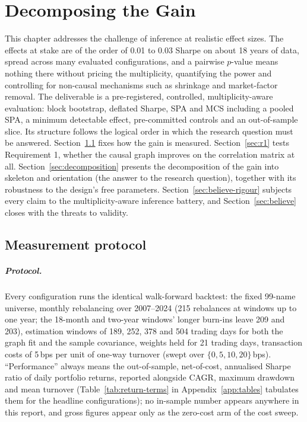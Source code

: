 \chapter{Decomposing the Gain}
\label{chap:evaluation}

This chapter addresses the challenge of inference at realistic effect sizes.
The effects at stake are of the order of 0.01 to 0.03 Sharpe on about
18 years of data, spread across many evaluated configurations, and a
pairwise $p$-value means nothing there without pricing the multiplicity,
quantifying the power and controlling for non-causal mechanisms such as
shrinkage and market-factor removal. The deliverable is a pre-registered,
controlled, multiplicity-aware evaluation: block bootstrap, deflated Sharpe,
SPA and MCS including a pooled SPA, a minimum detectable effect,
pre-committed controls and an out-of-sample slice. Its structure follows the
logical order in which the research question must be answered. Section~\ref{sec:method} fixes
how the gain is measured. Section~\ref{sec:r1} tests Requirement 1,
whether the causal graph improves on the correlation matrix at all.
Section~\ref{sec:decomposition} presents the decomposition of the gain
into
skeleton and orientation (the answer to the research question), together with its
robustness to the design's free parameters. Section~\ref{sec:believe-rigour}
subjects every claim to the multiplicity-aware inference battery, and
Section~\ref{sec:believe} closes with the threats to validity.

\section{Measurement protocol}
\label{sec:method}

\paragraph{Protocol.} Every configuration runs the identical walk-forward
backtest: the fixed 99-name universe, monthly rebalancing over 2007--2024
(215 rebalances at windows up to one year; the 18-month and two-year
windows' longer burn-ins leave 209 and 203), estimation windows of 189, 252,
378 and 504 trading days for both the graph fit and the sample covariance,
weights held for 21 trading days, transaction costs of 5\,bps per unit of
one-way turnover (swept over $\{0,5,10,20\}$\,bps). ``Performance'' always means the out-of-sample,
net-of-cost, annualised Sharpe ratio of daily portfolio returns, reported
alongside CAGR, maximum drawdown and mean turnover
(Table~\ref{tab:return-terms} in Appendix~\ref{app:tables} tabulates them
for the headline
configurations); no in-sample number appears anywhere in this report, and
gross figures appear only as the zero-cost arm of the cost sweep.

